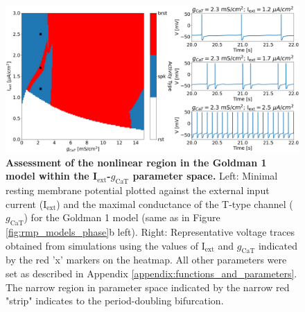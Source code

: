\documentclass[../main.tex]{subfiles}
\begin{document}
\begin{figure}[!t]
    \centering
    \includegraphics[width=\linewidth]{../img/rmp/nonlinearity_rmp.png}
    \caption[Assessment of the nonlinear region in the Goldman 1 model within the I$_{\text{ext}}$-$g_{\text{CaT}}$ parameter space]{
        \textbf{Assessment of the nonlinear region in the Goldman 1 model within the I$_{\text{ext}}$-$g_{\text{CaT}}$ parameter space.} Left: Minimal resting membrane potential plotted against the external input current (I$_{\text{ext}}$) and the maximal conductance of the T-type channel ($g_{\text{CaT}}$) for the Goldman 1 model (same as in Figure \ref{fig:rmp_models_phase}b left). Right:  Representative voltage traces obtained from simulations using the values of I$_{\text{ext}}$ and $g_{\text{CaT}}$ indicated by the red 'x' markers on the heatmap. All other parameters were set as described in Appendix \ref{appendix:functions_and_parameters}. The narrow region in parameter space indicated by the narrow red "strip" indicates to the period-doubling bifurcation.
    }
    \label{fig:nonlinearity_rmp}
\end{figure}
    
\end{document}
